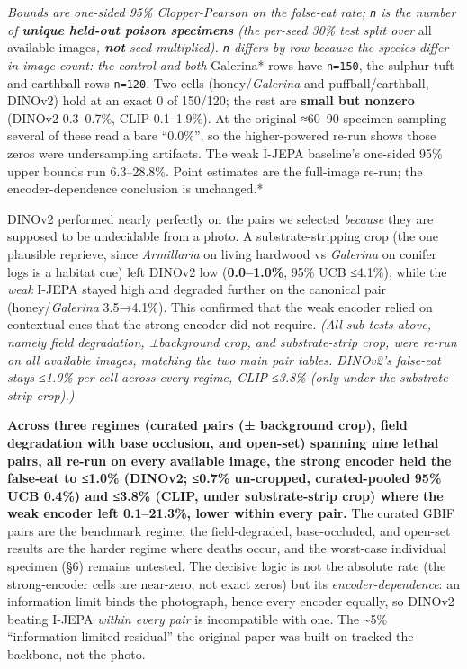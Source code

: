 \emph{Bounds are one-sided 95\% Clopper-Pearson on the false-eat rate;
\texttt{n} is the number of \textbf{unique held-out poison specimens}
(the per-seed 30\% test split over }all available images\emph{,
\textbf{not} seed-multiplied). \texttt{n} differs by row because the
species differ in image count: the control and both }Galerina* rows have
\texttt{n=150}, the sulphur-tuft and earthball rows \texttt{n=120}. Two
cells (honey/\emph{Galerina} and puffball/earthball, DINOv2) hold at an
exact 0 of 150/120; the rest are \textbf{small but nonzero} (DINOv2
0.3--0.7\%, CLIP 0.1--1.9\%). At the original ≈60--90-specimen sampling
several of these read a bare ``0.0\%'', so the higher-powered re-run
shows those zeros were undersampling artifacts. The weak I-JEPA
baseline's one-sided 95\% upper bounds run 6.3--28.8\%. Point estimates
are the full-image re-run; the encoder-dependence conclusion is
unchanged.*

DINOv2 performed nearly perfectly on the pairs we selected
\emph{because} they are supposed to be undecidable from a photo. A
substrate-stripping crop (the one plausible reprieve, since
\emph{Armillaria} on living hardwood vs \emph{Galerina} on conifer logs
is a habitat cue) left DINOv2 low (\textbf{0.0--1.0\%}, 95\% UCB
≤4.1\%), while the \emph{weak} I-JEPA stayed high and degraded further
on the canonical pair (honey/\emph{Galerina} 3.5→4.1\%). This confirmed
that the weak encoder relied on contextual cues that the strong encoder
did not require. \emph{(All sub-tests above, namely field degradation,
±background crop, and substrate-strip crop, were re-run on all available
images, matching the two main pair tables. DINOv2's false-eat stays
≤1.0\% per cell across every regime, CLIP ≤3.8\% (only under the
substrate-strip crop).)}

\textbf{Across three regimes (curated pairs (± background crop), field
degradation with base occlusion, and open-set) spanning nine lethal
pairs, all re-run on every available image, the strong encoder held the
false-eat to ≤1.0\% (DINOv2; ≤0.7\% un-cropped, curated-pooled 95\% UCB
0.4\%) and ≤3.8\% (CLIP, under substrate-strip crop) where the weak
encoder left 0.1--21.3\%, lower within every pair.} The curated GBIF
pairs are the benchmark regime; the field-degraded, base-occluded, and
open-set results are the harder regime where deaths occur, and the
worst-case individual specimen (§6) remains untested. The decisive logic
is not the absolute rate (the strong-encoder cells are near-zero, not
exact zeros) but its \emph{encoder-dependence}: an information limit
binds the photograph, hence every encoder equally, so DINOv2 beating
I-JEPA \emph{within every pair} is incompatible with one. The
\textasciitilde5\% ``information-limited residual'' the original paper
was built on tracked the backbone, not the photo.


